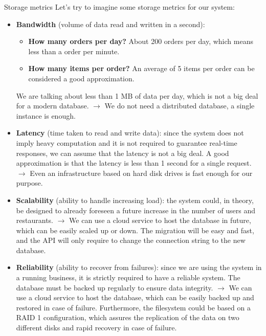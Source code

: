 \begin{frame}[allowframebreaks]{Storage metrics}
	Let's try to imagine some storage metrics for our system:

	\begin{itemize}
		\item \textbf{Bandwidth} (volume of data read and written in a second):
		\begin{itemize}
			\item{\textbf{How many orders per day?} About 200 orders per day, which %
			means less than a order per minute.}
			\item{\textbf{How many items per order?} An average of 5 items per order %
			can be considered a good approximation.}
		  \end{itemize}
		We are talking about less than 1 MB of data per day, which is not a big deal
		for a modern database. $\rightarrow$ \textcolor{UNITSBlue}{We do not need a %
		distributed database, a single instance is enough.}
		\item \textbf{Latency} (time taken to read and write data): since the system does %
		not imply heavy computation and it is not required to guarantee real-time %
		responses, we can assume that the latency is not a big deal. A good %
		approximation is that the latency is less than 1 second for a single %
		request. $\rightarrow$ \textcolor{UNITSBlue}{Even an infrastructure based on %
		hard disk drives is fast enough  for our purpose.}
		\item \textbf{Scalability} (ability to handle increasing load): the system could, %
		in theory, be designed to already foreseen a future increase in the number of %
		users and restaurants. $\rightarrow$ \textcolor{UNITSBlue}{We can use a cloud %
		service to host the database in future, which can be easily scaled up or down. %
		The migration will be easy and fast, and the API will only require to change the %
		connection string to the new database.}
		\item \textbf{Reliability} (ability to recover from failures): since we are using %
		the system in a running business, it is strictly required to have a %
		reliable system. The database must be backed up regularly to ensure data %
		integrity. $\rightarrow$ \textcolor{UNITSBlue}{We can use a cloud service to host %
		the database, which can be easily backed up and restored in case of failure. Furthermore, %
		the filesystem could be based on a RAID 1 configuration, which assures the replication %
		of the data on two different disks and rapid recovery in case of failure.}
	\end{itemize}

\end{frame}
